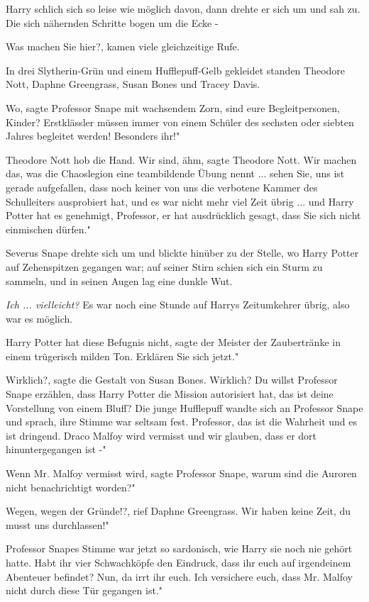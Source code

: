 Harry schlich sich so leise wie möglich davon, dann drehte er sich um und sah
zu. Die sich nähernden Schritte bogen um die Ecke -

\glqq Was machen Sie hier?\grqq{}, kamen viele gleichzeitige Rufe.

In drei Slytherin-Grün und einem Hufflepuff-Gelb gekleidet standen Theodore
Nott, Daphne Greengrass, Susan Bones und Tracey Davis.

\glqq Wo\grqq{}, sagte Professor Snape mit wachsendem Zorn, \glqq sind eure
Begleitpersonen, Kinder? Erstklässler müssen immer von einem Schüler des
sechsten oder siebten Jahres begleitet werden! Besonders ihr!"

Theodore Nott hob die Hand. \glqq Wir sind, ähm\grqq{}, sagte Theodore Nott.
\glqq Wir machen das, was die Chaoslegion eine teambildende Übung nennt ...
sehen Sie, uns ist gerade aufgefallen, dass noch keiner von uns die verbotene
Kammer des Schulleiters ausprobiert hat, und es war nicht mehr viel Zeit übrig
... und Harry Potter hat es genehmigt, Professor, er hat ausdrücklich gesagt,
dass Sie sich nicht einmischen dürfen."

Severus Snape drehte sich um und blickte hinüber zu der Stelle, wo Harry Potter
auf Zehenspitzen gegangen war; auf seiner Stirn schien sich ein Sturm zu
sammeln, und in seinen Augen lag eine dunkle Wut.

\emph{Ich ... vielleicht? }
Es war noch eine Stunde auf Harrys Zeitumkehrer übrig, also war es möglich.

\glqq Harry Potter hat diese Befugnis nicht\grqq{}, sagte der Meister der
Zaubertränke in einem trügerisch milden Ton. \glqq Erklären Sie sich jetzt."

\glqq Wirklich?\grqq{}, sagte die Gestalt von Susan Bones. \glqq Wirklich? Du
willst Professor Snape erzählen, dass Harry Potter die Mission autorisiert hat,
das ist deine Vorstellung von einem Bluff?\grqq{} Die junge Hufflepuff wandte
sich an Professor Snape und sprach, ihre Stimme war seltsam fest. \glqq
Professor, das ist die Wahrheit und es ist dringend. Draco Malfoy wird vermisst
und wir glauben, dass er dort hinuntergegangen ist -"

\glqq Wenn Mr. Malfoy vermisst wird\grqq{}, sagte Professor Snape, \glqq warum
sind die Auroren nicht benachrichtigt worden?"

\glqq Wegen, wegen der Gründe!?\grqq{}, rief Daphne Greengrass. \glqq Wir haben
keine Zeit, du musst uns durchlassen!"

Professor Snapes Stimme war jetzt so sardonisch, wie Harry sie noch nie gehört
hatte. \glqq Habt ihr vier Schwachköpfe den Eindruck, dass ihr euch auf
irgendeinem Abenteuer befindet? Nun, da irrt ihr euch. Ich versichere euch, dass
Mr. Malfoy nicht durch diese Tür gegangen ist."


